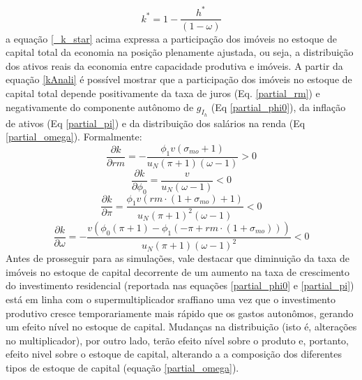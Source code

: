 \begin{equation}
\label{_k_star}
k^* = 1 - \frac{h^*}{(1 - \omega)}
\end{equation}
a equação \ref{_k_star} acima expressa a participação dos imóveis no estoque de capital total da economia na posição plenamente ajustada, ou seja, a distribuição dos ativos reais da economia entre capacidade produtiva e imóveis. 
A partir da equação \ref{kAnali} é possível mostrar que a participação dos imóveis no estoque de capital total depende 
positivamente da taxa de juros (Eq. \ref{partial_rm}) e 
negativamente do componente autônomo de $g_{I_h}$ (Eq \ref{partial_phi0}), da inflação de ativos (Eq \ref{partial_pi}) e da distribuição dos salários na renda (Eq \ref{partial_omega}). Formalmente:
\begin{equation}
\label{partial_rm}
\frac{\partial k}{\partial rm} = - \frac{\phi_{1} v \left(\sigma_{mo} + 1\right)}{u_N \left(\pi + 1\right) \left(\omega - 1\right)} > 0
\end{equation}
\begin{equation}
\label{partial_phi0}
\frac{\partial k}{\partial \phi_0} = \frac{v}{u_N \left(\omega - 1\right)} < 0
\end{equation}
\begin{equation}
\label{partial_pi}
\frac{\partial k}{\partial \pi} = \frac{\phi_{1} v \left(rm\cdot(1+\sigma_{mo}) + 1\right)}{u_N \left(\pi + 1\right)^{2} \left(\omega - 1\right)} < 0
\end{equation}
\begin{equation}
\label{partial_omega}
\frac{\partial k}{\partial \omega} = - \frac{v \left(\phi_{0} \left(\pi + 1\right) - \phi_{1} \left(- \pi + rm\cdot(1 + \sigma_{mo})\right)\right)}{u_N \left(\pi + 1\right) \left(\omega - 1\right)^{2}} < 0
\end{equation}
Antes de prosseguir para as simulações, vale destacar que diminuição da taxa de imóveis no estoque de capital decorrente de um aumento na taxa de crescimento do investimento residencial (reportada nas equações \ref{partial_phi0} e \ref{partial_pi}) está em linha com o supermultiplicador sraffiano uma vez que o
investimento produtivo cresce temporariamente mais rápido que os gastos autonômos, gerando um efeito nível no estoque de capital.
Mudanças na distribuição (isto é, alterações no multiplicador), por outro lado, 
terão efeito nível sobre o produto e, portanto, efeito nivel sobre o estoque de capital, alterando a a composição dos diferentes tipos de estoque de capital (equação \ref{partial_omega}). 


